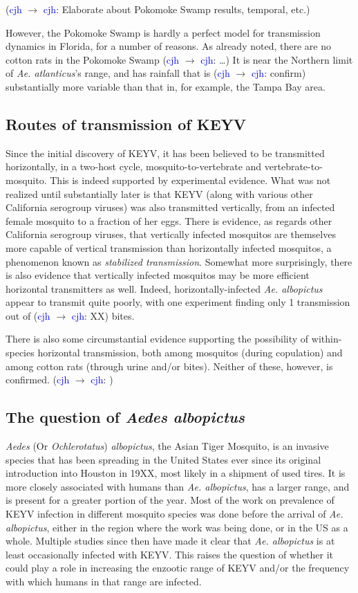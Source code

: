 \documentclass{article}
\newcommand{\cjh}{\textcolor{blue}{cjh}}
\newcommand{\msg}[3]{(#1 $\rightarrow$ #2: #3)}
\newcommand{\mcc}[1]{\msg\cjh\cjh{#1}}
\begin{document}
            \mcc{Elaborate about Pokomoke Swamp results, temporal, etc.}
            
            However, the Pokomoke Swamp is hardly a perfect model for transmission dynamics in Florida, for a number of reasons. As already noted, there are no cotton rats in the Pokomoke Swamp \mcc{\dots} It is near the Northern limit of \textit{Ae. atlanticus}'s range, and has rainfall that is \mcc{confirm} substantially more variable than that in, for example, the Tampa Bay area.

        \subsection{Routes of transmission of KEYV}
            Since the initial discovery of KEYV, it has been believed to be transmitted horizontally, in a two-host cycle, mosquito-to-vertebrate and vertebrate-to-mosquito. This is indeed supported by experimental evidence. What was not realized until substantially later is that KEYV (along with various other California serogroup viruses) was also transmitted vertically, from an infected female mosquito to a fraction of her eggs. There is evidence, as regards other California serogroup viruses, that vertically infected mosquitos are themselves more capable of vertical transmission than horizontally infected mosquitos, a phenomenon known as \textit{stabilized transmission}. Somewhat more surprisingly, there is also evidence that vertically infected mosquitos may be more efficient horizontal transmitters as well. Indeed, horizontally-infected \textit{Ae. albopictus} appear to transmit quite poorly, with one experiment finding only 1 transmission out of \mcc{XX} bites.

            There is also some circumstantial evidence supporting the possibility of within-species horizontal transmission, both among mosquitos (during copulation) and among cotton rats (through urine and/or bites). Neither of these, however, is confirmed. \mcc{}

        \subsection{The question of \textit{Aedes albopictus}}
            \textit{Aedes} (Or \textit{Ochlerotatus}) \textit{albopictus}, the Asian Tiger Mosquito, is an invasive species that has been spreading in the United States ever since its original introduction into Houston in 19XX, most likely in a shipment of used tires. It is more closely associated with humans than \textit{Ae. albopictus}, has a larger range, and is present for a greater portion of the year. Most of the work on prevalence of KEYV infection in different mosquito species was done before the arrival of \textit{Ae. albopictus}, either in the region where the work was being done, or in the US as a whole. Multiple studies since then have made it clear that \textit{Ae. albopictus} is at least occasionally infected with KEYV. This raises the question of whether it could play a role in increasing the enzootic range of KEYV and/or the frequency with which humans in that range are infected.
\end{document}
